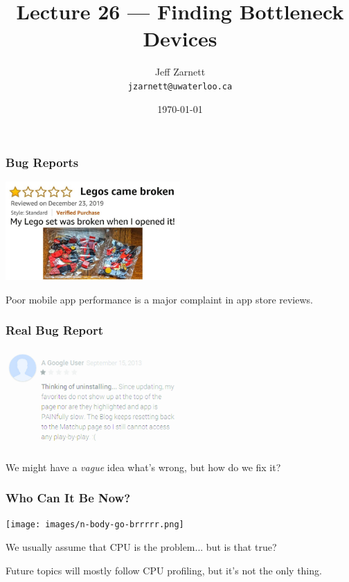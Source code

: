 

\title{Lecture 26 --- Finding Bottleneck Devices}

\author{Jeff Zarnett\\ \small \texttt{jzarnett@uwaterloo.ca}}
\date{\today}




\begin{frame}
  \titlepage

\end{frame}

\begin{frame}
\frametitle{Bug Reports}

\begin{center}
  \includegraphics[width=0.5\textwidth]{images/onestar.jpg}
\end{center}

Poor mobile app performance is a major complaint in app store reviews.

\end{frame}

\begin{frame}
\frametitle{Real Bug Report}

\begin{center}
  \includegraphics[width=0.5\textwidth]{images/slow-app.png}
\end{center}

We might have a \textit{vague} idea what's wrong, but how do we fix it?

\end{frame}


\begin{frame}
\frametitle{Who Can It Be Now?}

\begin{center}
	\texttt{[image: images/n-body-go-brrrrr.png]}
\end{center}

We usually assume that CPU is the problem... but is that true?

Future topics will mostly follow CPU profiling, but it's not the only thing.

\end{frame}




